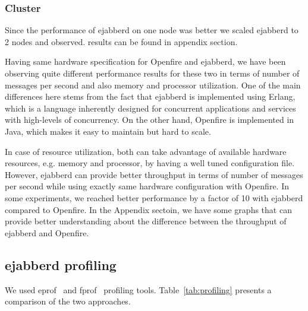 \documentclass[a4paper, twocolumn]{article}
\begin{document}
\subsubsection{Cluster}
Since the performance of ejabberd on one node was better we scaled ejabberd to 2 nodes and observed.
results can be found in appendix section.





Having same hardware specification for Openfire and ejabberd, we have been observing quite different performance results for these two in terms of number of messages per second and also memory and processor utilization. One of the main differences here stems from the fact that ejabberd is implemented using Erlang, which is a language inherently designed for concurrent applications and services with high-levels of concurrency. On the other hand, Openfire is implemented in Java, which makes it easy to maintain but hard to scale.

In case of resource utilization, both can take advantage of available hardware resources, e.g. memory and processor, by having a well tuned configuration file. However, ejabberd can provide better throughput in terms of number of messages per second while using exactly same hardware configuration with Openfire. In some experiments, we reached better performance by a factor of 10 with ejabberd compared to Openfire. In the Appendix sectoin, we have some graphs that can provide better understanding about the difference between the throughput of ejabberd and Openfire.

\subsection{ejabberd profiling}
We used eprof~\cite{erl_eprof} and fprof~\cite{erl_fprof} profiling tools. Table~\ref{tab:profiling} presents a comparison of the two approaches. 
\end{document}
